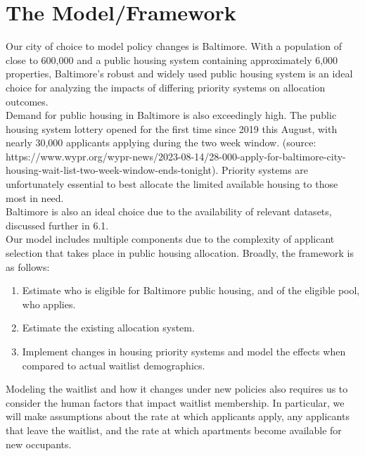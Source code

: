 \documentclass[11pt]{article}
\begin{document}
\section{The Model/Framework}
\noindent
Our city of choice to model policy changes is Baltimore. With a population of close to 600,000 and a public housing system containing approximately 6,000 properties, Baltimore's robust and widely used public housing system is an ideal choice for analyzing the impacts of differing priority systems on allocation outcomes. \\
\newline
Demand for public housing in Baltimore is also exceedingly high. The public housing system lottery opened for the first time since 2019 this August, with nearly 30,000 applicants applying during the two week window. (source: https://www.wypr.org/wypr-news/2023-08-14/28-000-apply-for-baltimore-city-housing-wait-list-two-week-window-ends-tonight). Priority systems are unfortunately essential to best allocate the limited available housing to those most in need. \\
\newline
Baltimore is also an ideal choice due to the availability of relevant datasets, discussed further in 6.1. \\
\newline 
Our model includes multiple components due to the complexity of applicant selection that takes place in public housing allocation. Broadly, the framework is as follows:
\begin{enumerate}
    \item Estimate who is eligible for Baltimore public housing, and of the eligible pool, who applies.
    \item Estimate the existing allocation system.
    \item Implement changes in housing priority systems and model the effects when compared to actual waitlist demographics. 
\end{enumerate}
Modeling the waitlist and how it changes under new policies also requires us to consider the human factors that impact waitlist membership. In particular, we will make assumptions about the rate at which applicants apply, any applicants that leave the waitlist, and the rate at which apartments become available for new occupants.
\end{document}
